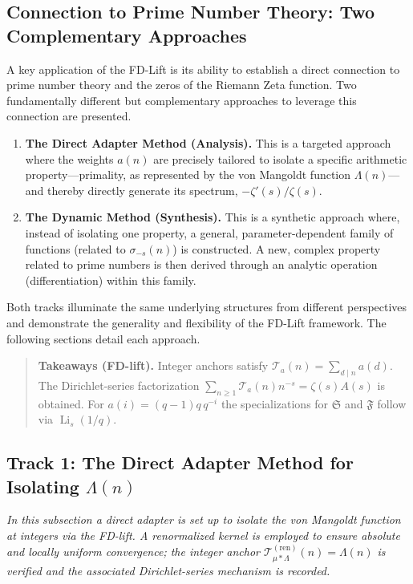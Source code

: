 \subsection{Connection to Prime Number Theory: Two Complementary Approaches}

A key application of the FD-Lift is its ability to establish a direct connection to prime number theory and the zeros of the Riemann Zeta function. Two fundamentally different but complementary approaches to leverage this connection are presented.
\begin{enumerate}
    \item \textbf{The Direct Adapter Method (Analysis).} This is a targeted approach where the weights $a(n)$ are precisely tailored to isolate a specific arithmetic property---primality, as represented by the von Mangoldt function $\Lambda(n)$---and thereby directly generate its spectrum, $-\zeta'(s)/\zeta(s)$.
    \item \textbf{The Dynamic Method (Synthesis).} This is a synthetic approach where, instead of isolating one property, a general, parameter-dependent family of functions (related to $\sigma_{-s}(n)$) is constructed. A new, complex property related to prime numbers is then derived through an analytic operation (differentiation) within this family.
\end{enumerate}
Both tracks illuminate the same underlying structures from different perspectives and demonstrate the generality and flexibility of the FD-Lift framework. The following sections detail each approach.

\begin{quote}\small
\textbf{Takeaways (FD-lift).}
Integer anchors satisfy $\mathcal T_a(n)=\sum_{d\mid n}a(d)$.
The Dirichlet-series factorization $\sum_{n\ge1}\mathcal T_a(n)n^{-s}=\zeta(s)A(s)$ is obtained.
For $a(i)=(q-1)q\,q^{-i}$ the specializations for $\mathfrak S$ and $\mathfrak F$ follow via $\operatorname{Li}_s(1/q)$.
\end{quote}


\subsection{Track 1: The Direct Adapter Method for Isolating \texorpdfstring{$\Lambda(n)$}{Lambda(n)}}

\par\smallskip
\noindent\textit{In this subsection a direct adapter is set up to isolate the von Mangoldt function at integers via the FD-lift. A renormalized kernel is employed to ensure absolute and locally uniform convergence; the integer anchor $\mathcal T^{(\mathrm{ren})}_{\mu*\Lambda}(n)=\Lambda(n)$ is verified and the associated Dirichlet-series mechanism is recorded.}
\par\medskip


